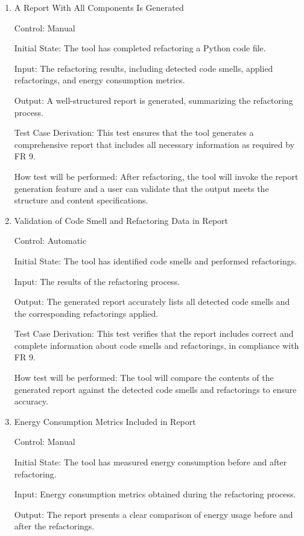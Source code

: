 \documentclass[12pt, titlepage]{article}
\begin{document}
\begin{enumerate}
  \item{A Report With All Components Is Generated\\}

Control: Manual

Initial State: The tool has completed refactoring a Python code file.

Input: The refactoring results, including detected code smells, applied refactorings, and energy consumption metrics.

Output: A well-structured report is generated, summarizing the refactoring process.

Test Case Derivation: This test ensures that the tool generates a comprehensive report that includes all necessary information as required by FR 9.

How test will be performed: After refactoring, the tool will invoke the report generation feature and a user can validate that the output meets the structure and content specifications.


\item{Validation of Code Smell and Refactoring Data in Report\\}

Control: Automatic

Initial State: The tool has identified code smells and performed refactorings.

Input: The results of the refactoring process.

Output: The generated report accurately lists all detected code smells and the corresponding refactorings applied.

Test Case Derivation: This test verifies that the report includes correct and complete information about code smells and refactorings, in compliance with FR 9.

How test will be performed: The tool will compare the contents of the generated report against the detected code smells and refactorings to ensure accuracy.


\item{Energy Consumption Metrics Included in Report\\}

Control: Manual

Initial State: The tool has measured energy consumption before and after refactoring.

Input: Energy consumption metrics obtained during the refactoring process.

Output: The report presents a clear comparison of energy usage before and after the refactorings.


\end{enumerate}
\end{document}
